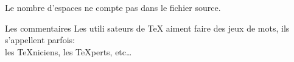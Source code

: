 Le nombre d'espaces     ne  compte
    pas
    dans le
	fichier source.

Les commentaires %
Les utili%
   sateurs de \TeX{} aiment faire
des jeux de mots, ils s'appellent
parfois:\\ les \TeX{}niciens, les
\TeX perts, etc\ldots

